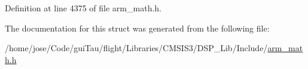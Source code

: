 Definition at line 4375 of file arm\-\_\-math.\-h.



The documentation for this struct was generated from the following file\-:\begin{DoxyCompactItemize}
\item 
/home/jose/\-Code/gui\-Tau/flight/\-Libraries/\-C\-M\-S\-I\-S3/\-D\-S\-P\-\_\-\-Lib/\-Include/\hyperlink{arm__math_8h}{arm\-\_\-math.\-h}\end{DoxyCompactItemize}
